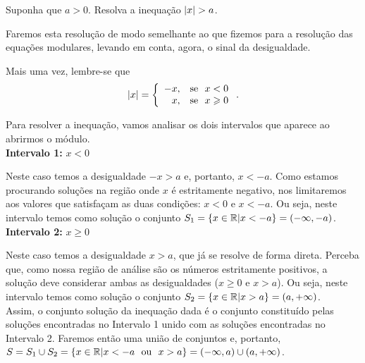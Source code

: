 \begin{exem}
   Suponha que $a> 0$. Resolva a inequação $\left|x\right| > a$.

Faremos esta resolução de modo semelhante ao que fizemos para a resolução das equações modulares, levando em conta, agora, o sinal da desigualdade.

Mais uma vez, lembre-se que 
 \[
\left|x\right|= \left\{\begin{array}{rl}
      -x , & \text{se} \ \ x<0 \\
      x , & \text{se} \ \ x \geqslant 0
     \end{array}\right. .
\]

Para resolver a inequação, vamos analisar os dois intervalos que aparece ao abrirmos o módulo.\\

\textbf{Intervalo 1:} $x < 0$

Neste caso temos a desigualdade $-x > a$ e, portanto, $x < -a$. Como estamos procurando soluções na região onde $x$ é estritamente negativo, nos limitaremos aos valores que satisfaçam as duas condições: $x < 0$ e $x < -a$. Ou seja, neste intervalo temos como solução o conjunto $S_1 = \{x \in \mathbb{R} | x < -a\} = (-\infty, -a)$.\\

\textbf{Intervalo 2:} $x\geq 0$

Neste caso temos a desigualdade $x>a$, que já se resolve de forma direta. Perceba que, como nossa região de análise são os números estritamente positivos, a solução deve considerar ambas as desigualdades ($x \geq 0$ e $x > a$). Ou seja, neste intervalo temos como solução o conjunto $S_2 = \{x \in \mathbb{R} | x > a\} = (a, +\infty)$.\\



Assim, o conjunto solução da inequação dada é o conjunto constituído pelas soluções encontradas no Intervalo 1 unido com as soluções encontradas no Intervalo 2. Faremos então uma união de conjuntos e, portanto, $S = S_1 \cup S_2 = \{x \in \mathbb{R}| x < -a \ \ \mbox{ou} \ \ x > a\} = (-\infty,a) \cup (a, + \infty)$.


\end{exem}
